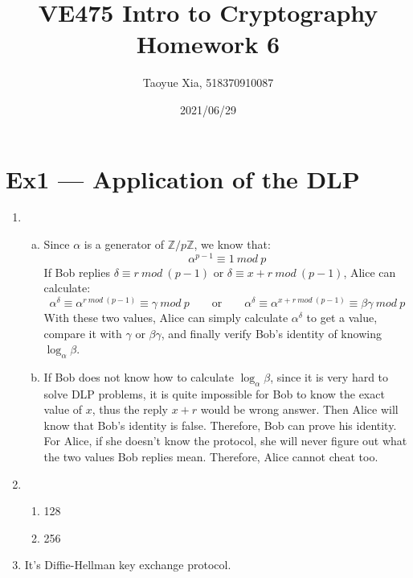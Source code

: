 \documentclass[12pt, a4paper]{article}
\begin{document}
\title{VE475 Intro to Cryptography Homework 6}
\author{Taoyue Xia, 518370910087}
\date{2021/06/29}
\maketitle

\section*{Ex1 --- Application of the DLP}
\begin{enumerate}
    \item \begin{enumerate}[a)]
        \item Since $\alpha$ is a generator of $\mathbb{Z}/p\mathbb{Z}$, we know that:
              $$\alpha^{p-1} \equiv 1\ mod\ p$$
              If Bob replies $\delta \equiv r\ mod\ (p-1)$ or $\delta \equiv x+r\ mod\ (p-1)$, Alice can calculate:
              $$\alpha^{\delta} \equiv \alpha^{r\ mod\ (p-1)} \equiv \gamma\ mod\ p\qquad \text{or} \qquad 
              \alpha^{\delta} \equiv \alpha^{x+r\ mod\ (p-1)} \equiv \beta\gamma\ mod\ p$$
              With these two values, Alice can simply calculate $\alpha^\delta$ to get a value, 
              compare it with $\gamma$ or $\beta\gamma$, and finally verify Bob's identity of knowing $\log_{\alpha} \beta$.
        \item If Bob does not know how to calculate $\log_{\alpha} \beta$, since it is very hard to solve DLP problems, 
              it is quite impossible for Bob to know the exact value of $x$, thus the reply $x+r$ would be wrong answer. 
              Then Alice will know that Bob's identity is false. Therefore, Bob can prove his identity.\\
              For Alice, if she doesn't know the protocol, she will never figure out what the two values Bob replies mean. 
              Therefore, Alice cannot cheat too.
    \end{enumerate}
    \item \begin{enumerate}
        \item 128
        \item 256
    \end{enumerate}
    \item It's Diffie-Hellman key exchange protocol.
\end{enumerate}
\end{document}
